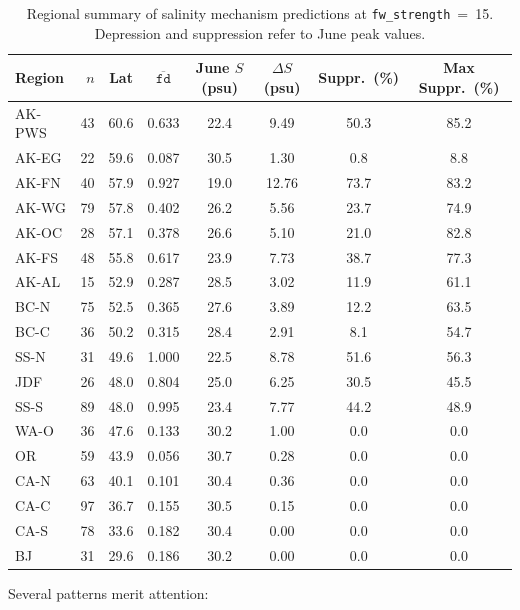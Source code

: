 \documentclass[11pt,a4paper]{article}
\begin{document}
\begin{table}[H]
\centering
\small
\caption{Regional summary of salinity mechanism predictions at \texttt{fw\_strength}~=~15. Depression and suppression refer to June peak values.}
\label{tab:regional}
\begin{tabular}{lrcccccc}
\toprule
Region & $n$ & Lat & $\overline{\texttt{fd}}$ & June $S$ (psu) & $\Delta S$ (psu) & Suppr.\ (\%) & Max Suppr.\ (\%) \\
\midrule
AK-PWS & 43  & 60.6 & 0.633 & 22.4  & 9.49  & 50.3  & 85.2 \\
AK-EG  & 22  & 59.6 & 0.087 & 30.5  & 1.30  & 0.8   & 8.8 \\
AK-FN  & 40  & 57.9 & 0.927 & 19.0  & 12.76 & 73.7  & 83.2 \\
AK-WG  & 79  & 57.8 & 0.402 & 26.2  & 5.56  & 23.7  & 74.9 \\
AK-OC  & 28  & 57.1 & 0.378 & 26.6  & 5.10  & 21.0  & 82.8 \\
AK-FS  & 48  & 55.8 & 0.617 & 23.9  & 7.73  & 38.7  & 77.3 \\
AK-AL  & 15  & 52.9 & 0.287 & 28.5  & 3.02  & 11.9  & 61.1 \\
BC-N   & 75  & 52.5 & 0.365 & 27.6  & 3.89  & 12.2  & 63.5 \\
BC-C   & 36  & 50.2 & 0.315 & 28.4  & 2.91  & 8.1   & 54.7 \\
SS-N   & 31  & 49.6 & 1.000 & 22.5  & 8.78  & 51.6  & 56.3 \\
JDF    & 26  & 48.0 & 0.804 & 25.0  & 6.25  & 30.5  & 45.5 \\
SS-S   & 89  & 48.0 & 0.995 & 23.4  & 7.77  & 44.2  & 48.9 \\
WA-O   & 36  & 47.6 & 0.133 & 30.2  & 1.00  & 0.0   & 0.0 \\
OR     & 59  & 43.9 & 0.056 & 30.7  & 0.28  & 0.0   & 0.0 \\
CA-N   & 63  & 40.1 & 0.101 & 30.4  & 0.36  & 0.0   & 0.0 \\
CA-C   & 97  & 36.7 & 0.155 & 30.5  & 0.15  & 0.0   & 0.0 \\
CA-S   & 78  & 33.6 & 0.182 & 30.4  & 0.00  & 0.0   & 0.0 \\
BJ     & 31  & 29.6 & 0.186 & 30.2  & 0.00  & 0.0   & 0.0 \\
\bottomrule
\end{tabular}
\end{table}

Several patterns merit attention:
\end{document}
